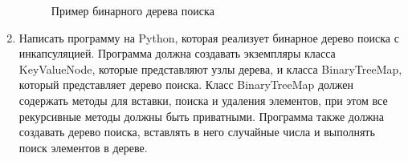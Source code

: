 \begin{enumerate}
\begin{figure}[h]
\centering
{}
\caption{Пример бинарного дерева поиска}
\end{figure}

\item Написать программу на Python, которая реализует бинарное дерево поиска с инкапсуляцией. Программа должна создавать экземпляры класса KeyValueNode, которые представляют узлы дерева, и класса BinaryTreeMap, который представляет дерево поиска. Класс BinaryTreeMap должен содержать методы для вставки, поиска и удаления элементов, при этом все рекурсивные методы должны быть приватными. Программа также должна создавать дерево поиска, вставлять в него случайные числа и выполнять поиск элементов в дереве.


\end{enumerate}
